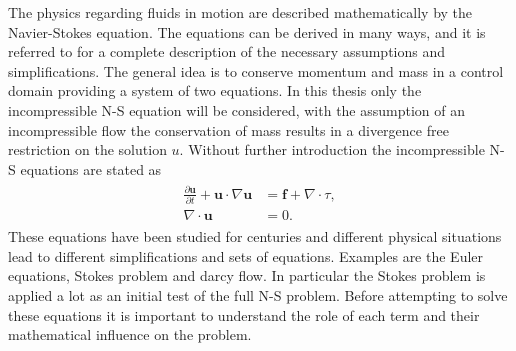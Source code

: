The physics regarding fluids in motion are described mathematically by the Navier-Stokes equation. 
The equations can be derived in many ways, and it is referred to \cite{White} for a complete 
description of the necessary assumptions and simplifications.
The general idea is to conserve momentum and mass in a control domain providing a system of two equations.
In this thesis only the incompressible N-S equation will be considered, 
with the assumption of an incompressible flow the conservation of mass 
results in a divergence free restriction on the solution $u$.
Without further introduction the incompressible  N-S equations are stated as  
%
\begin{align}
    \begin{split}
    \frac{\partial \mathbf{u}}{\partial t} + \mathbf{u}\cdot \nabla\mathbf{u} &= 
    \mathbf{f} + \nabla \cdot \tau, \\
		\nabla \cdot \mathbf{u} &= 0.
    \end{split}
	\label{eq:NS}
\end{align}
%
These equations have been studied for centuries and different physical situations
lead to different simplifications and sets of equations.
Examples are the Euler equations,
Stokes problem and darcy flow.
In particular the Stokes problem is applied a lot as an initial test of the full N-S problem. 
Before attempting to solve these equations it is important to understand the role of each term 
and their mathematical influence on the problem. 
